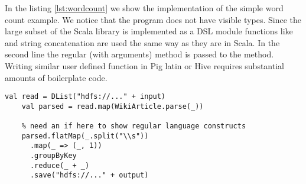 
In the listing \ref{lst:wordcount} we show the implementation of the simple word count example. We notice that the program does not have visible  types. Since the large subset of the Scala library is implemented as a DSL module functions like  and string concatenation are used the same way as they are in Scala. In the second line the regular (with  arguments) method is passed to the  method. Writing similar user defined function in Pig latin or Hive requires substantial amounts of boilerplate code.  

\begin{lstlisting}[name=code, caption=Example of word count program where type inference removes the need to declare any \scode{Rep} types., captionpos=b, label=lst:wordcount, float=t]
    val read = DList("hdfs://..." + input)
    val parsed = read.map(WikiArticle.parse(_))
    
    % need an if here to show regular language constructs
    parsed.flatMap(_.split("\\s"))
      .map(_ => (_, 1))
      .groupByKey
      .reduce(_ + _)
      .save("hdfs://..." + output)

\end{lstlisting}

